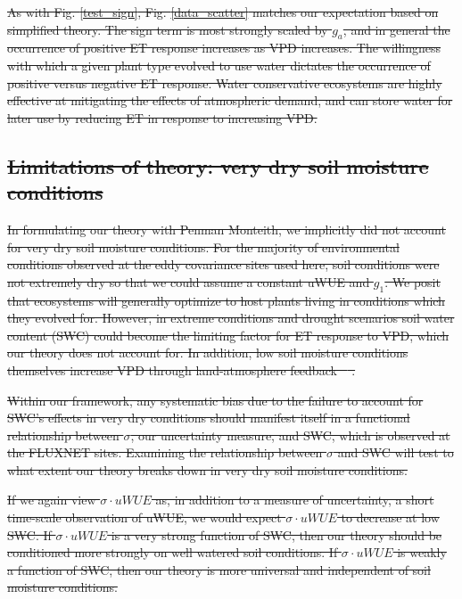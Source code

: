 \documentclass[hess, manuscript]{copernicus}
\providecommand{\DIFdeltex}[1]{{\protect\color{red}\sout{#1}}}                      %
\providecommand{\DIFdelbegin}{} %
\providecommand{\DIFdel}[1]{\texorpdfstring{\DIFdeltex{#1}}{}} %
\begin{document}
\DIFdelbegin \DIFdel{As with Fig. \ref{test_sign}, Fig. \ref{data_scatter} matches our
expectation based on simplified theory. The sign term is most strongly
scaled by $g_a$, and in general the occurrence of positive ET response increases as VPD increases. The willingness with which a given plant type
evolved to use water dictates the occurrence of positive versus
negative ET response. Water conservative ecosystems are highly effective
at mitigating the effects of atmospheric demand, and can store water
for later use by reducing ET in response to increasing VPD. }%

\subsection{\DIFdel{Limitations of theory: very dry soil moisture conditions}}
\addtocounter{subsection}{-1}%
\DIFdel{In
formulating our theory with Penman Monteith, we implicitly did not
account for very dry soil moisture conditions. For the majority of
environmental conditions observed at the eddy covariance sites used
here, soil conditions were not
extremely dry so that we could assume a
constant uWUE and $g_1$. We posit that ecosystems will generally
optimize to host plants living in conditions which they evolved
for. However, in extreme conditions and drought scenarios soil water
content (SWC) could become the limiting factor for ET response to VPD,
which our theory does not account for. In addition, low soil moisture
conditions themselves increase VPD through land-atmosphere feedback
\mbox{%
\citep[][]{Bouchet_1963, Morton_1965, Brutsaert_1999, Ozdogan_2006,
  Salvucci_2013, Gentine_2016, Berg_2016}}%
. }%

\DIFdel{Within our framework, any systematic bias due to the
failure to account for SWC's effects in very dry conditions should
manifest itself in a functional relationship between $\sigma$, our
uncertainty measure, and SWC, which is observed at the
FLUXNET
sites. Examining the relationship between $\sigma$ and SWC will test
to what extent our theory breaks down in very dry soil moisture
conditions.
}%

\DIFdel{If we again view $\sigma \cdot uWUE$ as, in addition to a measure of
uncertainty, a short time-scale observation of uWUE, we would expect
$\sigma \cdot uWUE$ to decrease at low SWC. If $\sigma \cdot uWUE$ is
a very strong function of SWC, then our theory should be conditioned
more strongly on well watered soil conditions. If $\sigma \cdot uWUE$
is weakly a function of SWC, then our theory is more universal and
independent of soil moisture conditions.
}%
\end{document}

